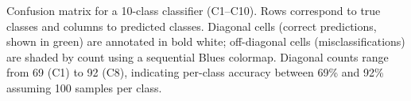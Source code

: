 \caption{Confusion matrix for a 10-class classifier (C1--C10). Rows correspond to true classes and columns to predicted classes. Diagonal cells (correct predictions, shown in green) are annotated in bold white; off-diagonal cells (misclassifications) are shaded by count using a sequential Blues colormap. Diagonal counts range from 69 (C1) to 92 (C8), indicating per-class accuracy between 69\% and 92\% assuming 100 samples per class.}
